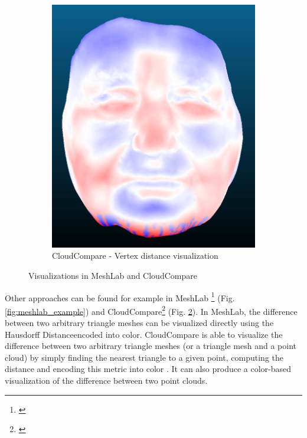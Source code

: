 \begin{figure}[h]
\begin{subfigure}{0.3\textwidth}
	\includegraphics[width=\textwidth]{./img/cloudcompare-example01.PNG}
    \caption{CloudCompare - Vertex distance visualization}
    \label{fig:cloudcompare_example}
	\end{subfigure}
\caption{Visualizations in MeshLab and CloudCompare}
\end{figure}

Other approaches can be found for example in MeshLab \footnote{\citet{MeshLab}} (Fig. \ref{fig:meshlab_example}) and CloudCompare\footnote{\citet{CloudCmp}} (Fig. \ref{fig:cloudcompare_example}). In MeshLab, the difference between two arbitrary triangle meshes can be visualized directly using the Hausdorff Distance\footnotemark encoded into color. CloudCompare is able to visualize the difference between two arbitrary triangle meshes (or a triangle mesh and a point cloud) by simply finding the nearest triangle to a given point, computing the distance and encoding this metric into color \citep{CloudCmpDistance}. It can also produce a color-based visualization of the difference between two point clouds.


